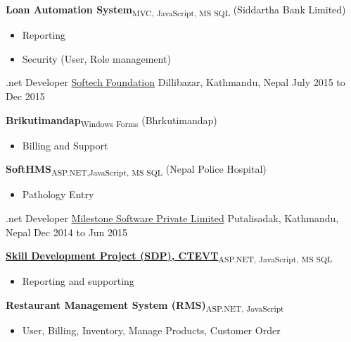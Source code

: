 \begin{cventries}
{\begin{cvitems}
		\item {\textbf{Loan Automation System}\textsubscript{MVC, JavaScript, MS SQL} (Siddartha Bank Limited)}
		\begin{itemize}
			\item {Reporting}
			\item {Security (User, Role management)}
		\end{itemize}
	\end{cvitems}
}
  \cventry
    {.net Developer} %
    {\href{http://softechfoundation.com/}{Softech Foundation}} %
    {Dillibazar, Kathmandu, Nepal} %
    {July 2015 to Dec 2015} %
    {
    	\begin{cvitems} %
    		\item {\textbf{Brikutimandap}\textsubscript{Windows Forms} (Bhrkutimandap)}
    		\begin{itemize}
    			\item {Billing and Support}
    		\end{itemize}
    		\item {\textbf{SoftHMS}\textsubscript{ASP.NET,JavaScript, MS SQL} (Nepal Police Hospital)}
    		\begin{itemize}
    			\item {Pathology Entry}
    		\end{itemize}
    	\end{cvitems}
    }
 
  \cventry
    {.net Developer} %
    {\href{http://milestonesoftware.com.np/}{Milestone Software Private Limited}} %
    {Putalisadak, Kathmandu, Nepal} %
    {Dec 2014 to Jun 2015} %
    {
      \begin{cvitems} %
        \item \textbf{\href{http://202.45.144.216/}{Skill Development Project (SDP), CTEVT}}\textsubscript{ASP.NET, JavaScript, MS SQL}
        \begin{itemize}
        \item {Reporting and supporting}
        \end{itemize}
        \item \textbf{Restaurant Management System (RMS)}\textsubscript{ASP.NET, JavaScript}
        \begin{itemize}
        \item {User, Billing, Inventory, Manage Products, Customer Order}
        \end{itemize}
      \end{cvitems}
    }


\end{cventries}
